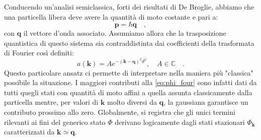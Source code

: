 Conducendo un'analisi semiclassica, forti dei risultati di De Broglie, abbiamo che una particella libera deve avere la quantità di moto costante e pari a:
\[
    \bm{p} = \hbar \bm{q} \quad,
\]
con $\bm{q}$ il vettore d'onda associato. Assumiamo allora che la trasposizione quantistica di questo sistema sia contraddistinta dai coefficienti della trasformata di Fourier così definiti:
\begin{equation}
    a(\bm{k}) = A e^{-(\bm{k}-\bm{q})^2 d^2}, \quad A \in \mathbb{C} \quad.
\end{equation}
Questo particolare ansatz ci permette di interpretare nella maniera più "classica" possibile la situazione. I maggiori contributi alla \eqref{eq:phi_four} sono infatti dati da tutti quegli stati con quantità di moto affini a quella assunta classicamente dalla particella mentre, per valori di $\bm{k}$ molto diversi da $\bm{q}$, la gaussiana garantisce un contributo prossimo allo zero. Globalmente, si registra che gli unici termini rilevanti ai fini del generico stato $\Phi$ derivano logicamente dagli stati stazionari $\Phi_{\bm{k}}$ caratterizzati da $\bm{k} \simeq \bm{q}$. 

